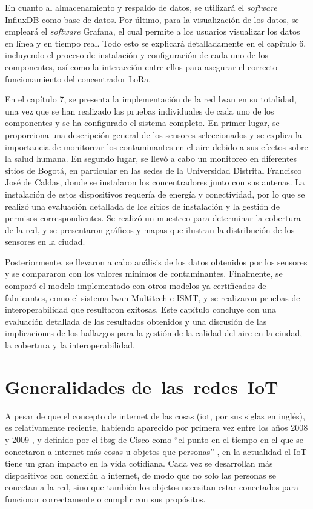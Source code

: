En cuanto al almacenamiento y respaldo de datos, se utilizará el \emph{software} InfluxDB como base de datos. Por último, para la visualización de los datos, se empleará el \emph{software} Grafana, el cual permite a los usuarios visualizar los datos en línea y en tiempo real. Todo esto se explicará detalladamente en el capítulo 6, incluyendo el proceso de instalación y configuración de cada uno de los componentes, así como la interacción entre ellos para asegurar el correcto funcionamiento del concentrador LoRa.

En el capítulo 7, se presenta la implementación de la red \gls{lwan} en su totalidad, una vez que se han realizado las pruebas individuales de cada uno de los componentes y se ha configurado el sistema completo. En primer lugar, se proporciona una descripción general de los sensores seleccionados y se explica la importancia de monitorear los contaminantes en el aire debido a sus efectos sobre la salud humana. En segundo lugar, se llevó a cabo un monitoreo en diferentes sitios de Bogotá, en particular en las sedes de la Universidad Distrital Francisco José de Caldas, donde se instalaron los concentradores junto con sus antenas. La instalación de estos dispositivos requería de energía y conectividad, por lo que se realizó una evaluación detallada de los sitios de instalación y la gestión de permisos correspondientes. Se realizó un muestreo para determinar la cobertura de la red, y se presentaron gráficos y mapas que ilustran la distribución de los sensores en la ciudad.

Posteriormente, se llevaron a cabo análisis de los datos obtenidos por los sensores y se compararon con los valores mínimos de contaminantes. Finalmente, se comparó el modelo implementado con otros modelos ya certificados de fabricantes, como el sistema \gls{lwan} Multitech e ISMT, y se realizaron pruebas de interoperabilidad que resultaron exitosas. Este capítulo concluye con una evaluación detallada de los resultados obtenidos y una discusión de las implicaciones de los hallazgos para la gestión de la calidad del aire en la ciudad, la cobertura y la interoperabilidad.

\chapter{Generalidades de~las~redes~IoT}

A pesar de que el concepto de internet de las cosas (\gls{iot}, por sus siglas en inglés), es relativamente reciente, habiendo aparecido por primera vez entre los años 2008 y 2009 \cite{Evans2011TheEverything}, y definido por el \gls{ibsg} de Cisco como “el punto en el tiempo en el que se conectaron a internet más cosas u objetos que personas” \cite{Alcaraz2014InternetCosas}, en la actualidad el IoT tiene un gran impacto en la vida cotidiana. Cada vez se desarrollan más dispositivos con conexión a internet, de modo que no solo las personas se conectan a la red, sino que también los objetos necesitan estar conectados para funcionar correctamente o cumplir con sus propósitos.

